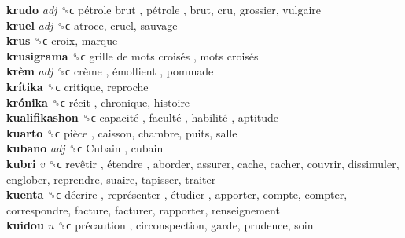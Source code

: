\textbf{krudo} \emph{adj}  ␝ϲ   pétrole brut ,  pétrole , brut, cru, grossier, vulgaire  \\
\textbf{kruel} \emph{adj}  ␝ϲ  atroce, cruel, sauvage  \\
\textbf{krus} ␝ϲ  croix, marque  \\
\textbf{krusigrama} ␝ϲ   grille de mots croisés ,  mots croisés   \\
\textbf{krèm} \emph{adj}  ␝ϲ   crème ,  émollient , pommade  \\
\textbf{krítika} ␝ϲ  critique, reproche  \\
\textbf{krónika} ␝ϲ   récit , chronique, histoire  \\
\textbf{kualifikashon} ␝ϲ   capacité ,  faculté ,  habilité , aptitude  \\
\textbf{kuarto} ␝ϲ   pièce , caisson, chambre, puits, salle  \\
\textbf{kubano} \emph{adj}  ␝ϲ   Cubain , cubain  \\
\textbf{kubri} \emph{v}  ␝ϲ   revêtir ,  étendre , aborder, assurer, cache, cacher, couvrir, dissimuler, englober, reprendre, suaire, tapisser, traiter  \\
\textbf{kuenta} ␝ϲ   décrire ,  représenter ,  étudier , apporter, compte, compter, correspondre, facture, facturer, rapporter, renseignement  \\
\textbf{kuidou} \emph{n}  ␝ϲ   précaution , circonspection, garde, prudence, soin  \\

